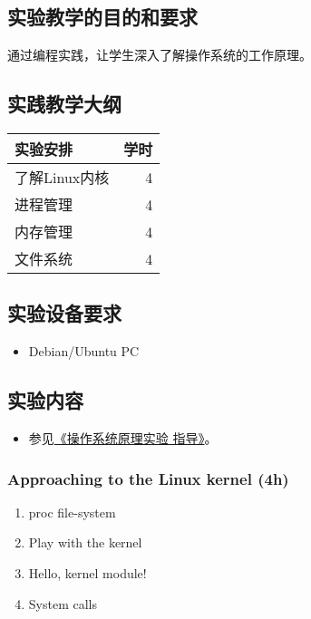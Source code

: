 \documentclass{wx672article}
\begin{document}
\subsection{实验教学的目的和要求}
\label{sec-3-1}

通过编程实践，让学生深入了解操作系统的工作原理。

\subsection{实践教学大纲}
\label{sec-3-2}

\begin{center}
  \begin{tabular}{lr}
    \hline
    实验安排 & 学时\\
    \hline
    了解Linux内核 & 4\\
    进程管理 & 4\\
    内存管理 & 4\\
    文件系统 & 4\\
    \hline
  \end{tabular}
\end{center}

\subsection{实验设备要求}
\label{sec-3-3}

\begin{itemize}
\item Debian/Ubuntu PC
\end{itemize}

\subsection{实验内容}
\label{sec-3-4}

\begin{itemize}
\item 参见\href{http://cs2.swfu.edu.cn/~wx672/lecture_notes/os/lab.html}{《操作系统原理实验
    指导》}。
\end{itemize}

\subsubsection{Approaching to the Linux kernel (4h)}
\label{sec-3-4-1}

\begin{enumerate}
\item proc file-system
\item Play with the kernel
\item Hello, kernel module!
\item System calls
\end{enumerate}
\end{document}
